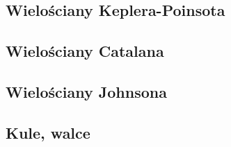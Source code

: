 \subsection{Wielościany Keplera-Poinsota}


\subsection{Wielościany Catalana}


\subsection{Wielościany Johnsona}



\subsection{Kule, walce}
